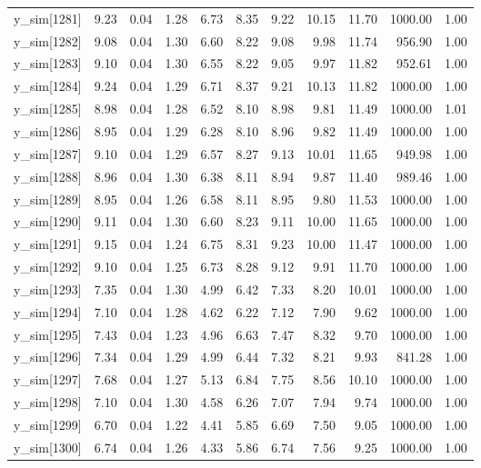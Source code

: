 \begin{table}[ht]
\begin{tabular}{rrrrrrrrrrr}
  y\_sim[1281] & 9.23 & 0.04 & 1.28 & 6.73 & 8.35 & 9.22 & 10.15 & 11.70 & 1000.00 & 1.00 \\ 
  y\_sim[1282] & 9.08 & 0.04 & 1.30 & 6.60 & 8.22 & 9.08 & 9.98 & 11.74 & 956.90 & 1.00 \\ 
  y\_sim[1283] & 9.10 & 0.04 & 1.30 & 6.55 & 8.22 & 9.05 & 9.97 & 11.82 & 952.61 & 1.00 \\ 
  y\_sim[1284] & 9.24 & 0.04 & 1.29 & 6.71 & 8.37 & 9.21 & 10.13 & 11.82 & 1000.00 & 1.00 \\ 
  y\_sim[1285] & 8.98 & 0.04 & 1.28 & 6.52 & 8.10 & 8.98 & 9.81 & 11.49 & 1000.00 & 1.01 \\ 
  y\_sim[1286] & 8.95 & 0.04 & 1.29 & 6.28 & 8.10 & 8.96 & 9.82 & 11.49 & 1000.00 & 1.00 \\ 
  y\_sim[1287] & 9.10 & 0.04 & 1.29 & 6.57 & 8.27 & 9.13 & 10.01 & 11.65 & 949.98 & 1.00 \\ 
  y\_sim[1288] & 8.96 & 0.04 & 1.30 & 6.38 & 8.11 & 8.94 & 9.87 & 11.40 & 989.46 & 1.00 \\ 
  y\_sim[1289] & 8.95 & 0.04 & 1.26 & 6.58 & 8.11 & 8.95 & 9.80 & 11.53 & 1000.00 & 1.00 \\ 
  y\_sim[1290] & 9.11 & 0.04 & 1.30 & 6.60 & 8.23 & 9.11 & 10.00 & 11.65 & 1000.00 & 1.00 \\ 
  y\_sim[1291] & 9.15 & 0.04 & 1.24 & 6.75 & 8.31 & 9.23 & 10.00 & 11.47 & 1000.00 & 1.00 \\ 
  y\_sim[1292] & 9.10 & 0.04 & 1.25 & 6.73 & 8.28 & 9.12 & 9.91 & 11.70 & 1000.00 & 1.00 \\ 
  y\_sim[1293] & 7.35 & 0.04 & 1.30 & 4.99 & 6.42 & 7.33 & 8.20 & 10.01 & 1000.00 & 1.00 \\ 
  y\_sim[1294] & 7.10 & 0.04 & 1.28 & 4.62 & 6.22 & 7.12 & 7.90 & 9.62 & 1000.00 & 1.00 \\ 
  y\_sim[1295] & 7.43 & 0.04 & 1.23 & 4.96 & 6.63 & 7.47 & 8.32 & 9.70 & 1000.00 & 1.00 \\ 
  y\_sim[1296] & 7.34 & 0.04 & 1.29 & 4.99 & 6.44 & 7.32 & 8.21 & 9.93 & 841.28 & 1.00 \\ 
  y\_sim[1297] & 7.68 & 0.04 & 1.27 & 5.13 & 6.84 & 7.75 & 8.56 & 10.10 & 1000.00 & 1.00 \\ 
  y\_sim[1298] & 7.10 & 0.04 & 1.30 & 4.58 & 6.26 & 7.07 & 7.94 & 9.74 & 1000.00 & 1.00 \\ 
  y\_sim[1299] & 6.70 & 0.04 & 1.22 & 4.41 & 5.85 & 6.69 & 7.50 & 9.05 & 1000.00 & 1.00 \\ 
  y\_sim[1300] & 6.74 & 0.04 & 1.26 & 4.33 & 5.86 & 6.74 & 7.56 & 9.25 & 1000.00 & 1.00 \\ 

\end{tabular}
\end{table}
